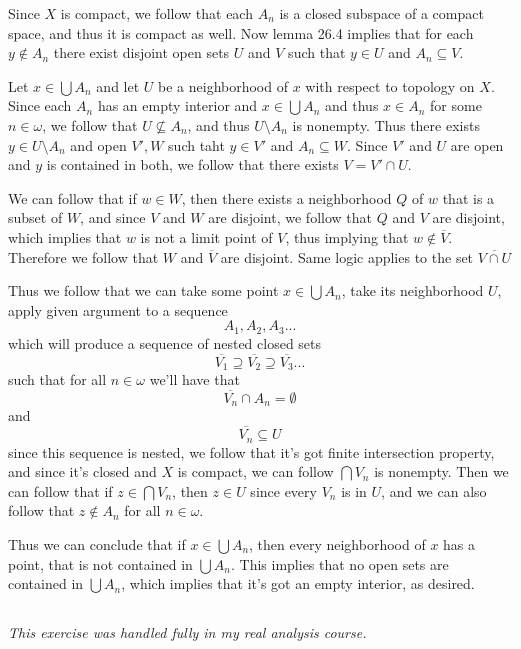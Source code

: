 \documentclass[11pt,oneside,titlepage]{book}
\begin{document}
Since $X$ is compact, we follow that each $A_n$ is a closed subspace of a compact space, and
thus it is compact as well. Now lemma 26.4 implies that for each $y \notin A_n$ there
exist disjoint open sets $U$ and $V$ such that $y \in U$ and $A_n \subseteq V$.

Let $x \in \bigcup{A_n}$ and let $U$ be a neighborhood of $x$ with respect to topology on $X$.
Since each $A_n$ has an empty interior and $x \in \bigcup{A_n}$ and thus $x \in A_n$ for some
$n \in \omega$, we follow that $U \not \subseteq A_n$, and
thus $U \setminus A_n$ is nonempty. Thus there exists $y \in U \setminus A_n$ and open $V', W$
such taht $y \in V'$ and $A_n \subseteq W$. Since $V'$ and $U$ are open and $y$ is
contained in both, we follow that there exists $V = V' \cap U$.

We can follow that if $w \in W$, then there exists a neighborhood $Q$ of $w$ that is a
subset of $W$, and since $V$ and $W$ are disjoint, we follow that $Q$ and $V$ are
disjoint, which implies that $w$ is not a limit point of $V$, thus implying that
$w \notin \overline{V}$. Therefore we follow that $W$ and $\overline{V}$ are disjoint.
Same logic applies to the set $\overline{V \cap U}$

Thus we follow that we can take some point $x \in \bigcup{A_n}$, take
its neighborhood $U$, apply given argument to a sequence 
$$A_1, A_2, A_3...$$
which will produce a sequence of nested closed sets
$$\overline{V_1} \supseteq \overline{V_2} \supseteq \overline{V_3} ...$$
such that for all $n \in \omega$ we'll have that 
$$\overline{V_n} \cap A_n = \emptyset$$
and
$$\overline{V_n} \subseteq U$$
since this sequence is nested, we follow that it's got finite intersection property,
and since it's closed and $X$ is compact, we can follow $\bigcap{V_n}$ is nonempty.
Then we can follow that if $z \in \bigcap{V_n}$, then $z \in U$ since every $V_n$ is
in $U$, and we can also follow that $z \notin A_n$ for all $n \in \omega$.

Thus we can conclude that if $x \in \bigcup{A_n}$, then every neighborhood of $x$
has a point, that is not contained in $\bigcup{A_n}$. This implies that no open
sets are contained in $\bigcup{A_n}$, which implies that it's got an empty interior,
as desired.

\subsection{}

\textit{This exercise was handled fully in my real analysis course.}
\end{document}
